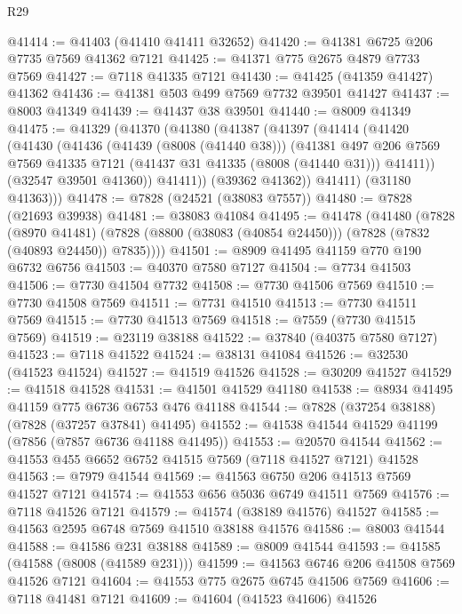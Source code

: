 \begin{lexlean}{R29}
\begin{coremodule}
@41414 := @41403 (@41410 @41411 @32652)
@41420 := @41381 @6725 @206 @7735 @7569 @41362 @7121
@41425 := @41371 @775 @2675 @4879 @7733 @7569
@41427 := @7118 @41335 @7121
@41430 := @41425 (@41359 @41427) @41362
@41436 := @41381 @503 @499 @7569 @7732 @39501 @41427
@41437 := @8003 @41349
@41439 := @41437 @38 @39501
@41440 := @8009 @41349
@41475 := @41329
    (@41370
      (@41380
        (@41387
          (@41397
            (@41414
              (@41420
                (@41430
                  (@41436
                    (@41439 (@8008 (@41440 @38)))
                    (@41381
                      @497
                      @206
                      @7569
                      @7569
                      @41335
                      @7121
                      (@41437 @31 @41335 (@8008 (@41440 @31)))
                      @41411))
                  (@32547 @39501 @41360))
                @41411))
            (@39362 @41362))
          @41411)
        (@31180 @41363)))
@41478 := @7828 (@24521 (@38083 @7557))
@41480 := @7828 (@21693 @39938)
@41481 := @38083 @41084
@41495 := @41478
    (@41480
      (@7828
        (@8970 @41481)
        (@7828 (@8800 (@38083 (@40854 @24450))) (@7828 (@7832 (@40893 @24450)) @7835))))
@41501 := @8909 @41495 @41159 @770 @190 @6732 @6756
@41503 := @40370 @7580 @7127
@41504 := @7734 @41503
@41506 := @7730 @41504 @7732
@41508 := @7730 @41506 @7569
@41510 := @7730 @41508 @7569
@41511 := @7731 @41510
@41513 := @7730 @41511 @7569
@41515 := @7730 @41513 @7569
@41518 := @7559 (@7730 @41515 @7569)
@41519 := @23119 @38188
@41522 := @37840 (@40375 @7580 @7127)
@41523 := @7118 @41522
@41524 := @38131 @41084
@41526 := @32530 (@41523 @41524)
@41527 := @41519 @41526
@41528 := @30209 @41527
@41529 := @41518 @41528
@41531 := @41501 @41529 @41180
@41538 := @8934 @41495 @41159 @775 @6736 @6753 @476 @41188
@41544 := @7828 (@37254 @38188) (@7828 (@37257 @37841) @41495)
@41552 := @41538 @41544 @41529 @41199 (@7856 (@7857 @6736 @41188 @41495))
@41553 := @20570 @41544
@41562 := @41553 @455 @6652 @6752 @41515 @7569 (@7118 @41527 @7121) @41528
@41563 := @7979 @41544
@41569 := @41563 @6750 @206 @41513 @7569 @41527 @7121
@41574 := @41553 @656 @5036 @6749 @41511 @7569
@41576 := @7118 @41526 @7121
@41579 := @41574 (@38189 @41576) @41527
@41585 := @41563 @2595 @6748 @7569 @41510 @38188 @41576
@41586 := @8003 @41544
@41588 := @41586 @231 @38188
@41589 := @8009 @41544
@41593 := @41585 (@41588 (@8008 (@41589 @231)))
@41599 := @41563 @6746 @206 @41508 @7569 @41526 @7121
@41604 := @41553 @775 @2675 @6745 @41506 @7569
@41606 := @7118 @41481 @7121
@41609 := @41604 (@41523 @41606) @41526

\end{coremodule}
\end{lexlean}
